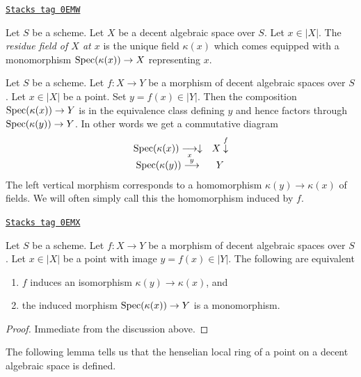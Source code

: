 \begin{definition}
\label{decent-spaces-definition-residue-field}
\href{https://stacks.math.columbia.edu/tag/0EMW}{\texttt{Stacks tag 0EMW}}

Let $S$ be a scheme. Let $X$ be a decent algebraic space over $S$.
Let $x \in |X|$. The {\it residue field of $X$ at $x$}
is the unique field $\kappa(x)$ which comes equipped with a
monomorphism $\operatorname{Spec}(\kappa(x)) \to X$ representing $x$.
\end{definition}

Let $S$ be a scheme. Let $f : X \to Y$ be a morphism of decent
algebraic spaces over $S$. Let $x \in |X|$ be a point.
Set $y = f(x) \in |Y|$. Then the composition $\operatorname{Spec}(\kappa(x)) \to Y$
is in the equivalence class defining $y$ and hence factors through
$\operatorname{Spec}(\kappa(y)) \to Y$. In other words we get a commutative diagram
$$
\begin{array}{cc}\operatorname{Spec}(\kappa(x)) \underset{x}{\longrightarrow}\downarrow & X \overset{f}{\downarrow} \\ \operatorname{Spec}(\kappa(y)) \overset{y}{\longrightarrow} & Y\end{array}
$$
The left vertical morphism corresponds to a homomorphism
$\kappa(y) \to \kappa(x)$ of fields. We will often simply
call this the homomorphism induced by $f$.

\begin{lemma}
\label{decent-spaces-lemma-identifies-residue-fields}
\href{https://stacks.math.columbia.edu/tag/0EMX}{\texttt{Stacks tag 0EMX}}

Let $S$ be a scheme. Let $f : X \to Y$ be a morphism of decent
algebraic spaces over $S$. Let $x \in |X|$ be a point
with image $y = f(x) \in |Y|$.
The following are equivalent
\begin{enumerate}
\item $f$ induces an isomorphism $\kappa(y) \to \kappa(x)$, and
\item the induced morphism $\operatorname{Spec}(\kappa(x)) \to Y$ is a monomorphism.
\end{enumerate}
\end{lemma}

\begin{proof}
Immediate from the discussion above.
\end{proof}

The following lemma tells us that the henselian local ring of a point
on a decent algebraic space is defined.

